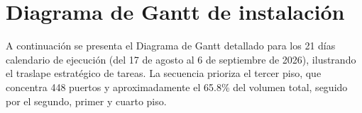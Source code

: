 \clearpage

\section{Diagrama de Gantt de instalación}

A continuación se presenta el Diagrama de Gantt detallado para los 21 días calendario de ejecución (del 17 de agosto al 6 de septiembre de 2026), ilustrando el traslape estratégico de tareas. La secuencia prioriza el tercer piso, que concentra 448 puertos y aproximadamente el 65.8\% del volumen total, seguido por el segundo, primer y cuarto piso.

\begin{table}[H]
\centering
\caption{Diagrama de Gantt - Ejecución del Proyecto (Agosto-Septiembre 2026)}
\end{table}
